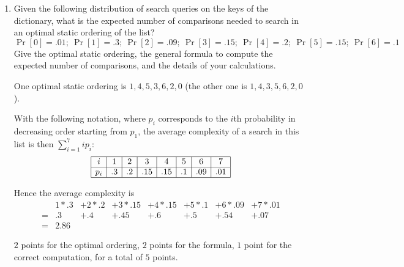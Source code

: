 \begin{enumerate}
\begin{solution}
\end{solution}

\item Given the following distribution of search queries on the keys
of the dictionary, what is the expected number of comparisons needed to
search in an optimal static ordering of the list?
%
$$
\Pr[0]{=}.01;\
\Pr[1]{=}.3;\
\Pr[2]{=}.09;\
\Pr[3]{=}.15;\
\Pr[4]{=}.2;\
\Pr[5]{=}.15;\
\Pr[6]{=}.1
$$
Give the optimal static ordering, the general formula to compute the
expected number of comparisons, and the details of your calculations.

\begin{spaceForAnswer}

\vfil

\end{spaceForAnswer}
%
\begin{solution}
One optimal static ordering is $1,4,5,3,6,2,0$ (the other one is $1,4,3,5,6,2,0$).

With the following notation, where $p_i$ corresponds to the $i$th
probability in decreasing order starting from $p_1$, the average
complexity of a search in this list is then $\sum_{i=1}^{7} i p_i$:
$$
\begin{array}{|c|c|c|c|c|c|c|c|} \hline
i   & 1  & 2  & 3 & 4 & 5 & 6 & 7 \\ \hline
p_i & .3 & .2 &.15&.15&.1 &.09&.01\\  \hline
\end{array}
$$

Hence the average complexity is
$$
\begin{array}{llllllll}
&   1 * .3
& + 2 * .2
& + 3 * .15
& + 4 * .15
& + 5 * .1
& + 6 * .09
& + 7 * .01
\\
=
&   .3
& + .4
& + .45
& + .6
& + .5
& + .54
& + .07
\\
=
& 2.86
\end{array}
$$
\end{solution}
\begin{markingScheme}
$2$ points for the optimal ordering,
$2$ points for the formula,
$1$ point for the correct computation,
for a total of $5$ points.
\end{markingScheme}
\end{enumerate}
